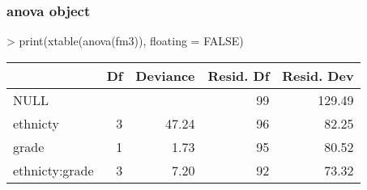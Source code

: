 \documentclass[letterpaper]{article}
\begin{document}
\subsubsection{anova object}
\begin{Schunk}
\begin{Sinput}
> print(xtable(anova(fm3)), floating = FALSE)
\end{Sinput}
% latex table generated in R 2.6.0 by xtable 1.5-2 package
% Wed Oct 10 14:26:36 2007
\begin{tabular}{lrrrr}
  \hline
 & Df & Deviance & Resid. Df & Resid. Dev \\
  \hline
NULL &  &  & 99 & 129.49 \\
  ethnicty & 3 & 47.24 & 96 & 82.25 \\
  grade & 1 & 1.73 & 95 & 80.52 \\
  ethnicty:grade & 3 & 7.20 & 92 & 73.32 \\
   \hline
\end{tabular}\end{Schunk}
\end{document}
